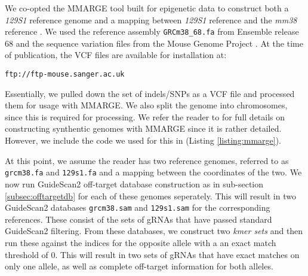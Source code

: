 \documentclass[10pt]{article}
\begin{document}
We co-opted the MMARGE tool built for epigenetic data to construct
both a \textit{129S1} reference genome and a mapping between
\textit{129S1} reference and the \textit{mm38} reference \parencite{link2018mmarge}. We used
the reference assembly \texttt{GRCm38\_68.fa} from Ensemble release 68
and the sequence variation files from the Mouse Genome Project
\parencite{keane2011mouse}. At the time of publication, the VCF files
are available for installation at:

\begin{center}
  \texttt{ftp://ftp-mouse.sanger.ac.uk}
\end{center}

Essentially, we pulled down the set of indels/SNPs as a VCF file and
processed them for usage with MMARGE. We also split the genome into
chromosomes, since this is required for processing. We refer the
reader to \parencite{link2018mmarge} for full details on constructing
synthentic genomes with MMARGE since it is rather detailed. However,
we include the code we used for this in (Listing
\ref{listing:mmarge}).

At this point, we assume the reader has two reference genomes,
referred to as \texttt{grcm38.fa} and \texttt{129s1.fa} and a mapping
between the coordinates of the two. We now run GuideScan2 off-target
database construction as in sub-section \ref{subsec:offtargetdb} for
each of these genomes seperately. This will result in two GuideScan2
databases \texttt{grcm38.sam} and \texttt{129s1.sam} for the
corresponding references. These consist of the sets of gRNAs that have
passed standard GuideScan2 filtering. From these databases, we
construct two {\it kmer sets} and then run these against the indices
for the opposite allele with a an exact match threshold of 0. This
will result in two sets of gRNAs that have exact matches on only one
allele, as well as complete off-target information for both alleles.

\end{document}
